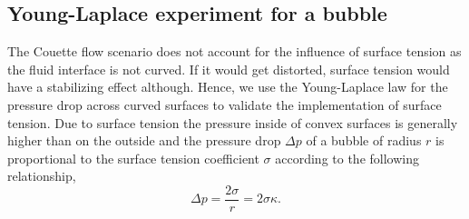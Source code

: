 \documentclass[final,leqno,onefignum,onetabnum]{siamltexmm}
\begin{document}
\subsection{Young-Laplace experiment for a bubble}
The Couette flow scenario does not account for the influence of surface tension as the fluid interface is not curved. If it would get distorted, surface tension would have a stabilizing effect although. 
Hence, we use the Young-Laplace law for the pressure drop across curved surfaces to validate the implementation of surface tension. Due to surface tension the pressure inside of convex surfaces is generally higher than on the outside and the pressure drop $\Delta p$ of a bubble of radius $r$ is proportional to the surface tension coefficient $\sigma$ according to the following relationship,
\begin{equation}
	\Delta p = \frac{2\sigma}{r} = 2 \sigma \kappa .
\end{equation}
\end{document}
